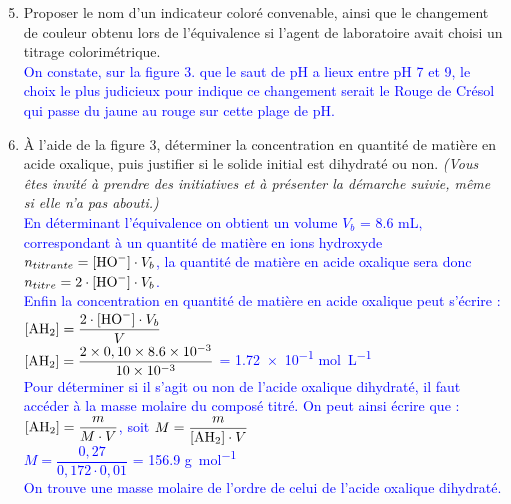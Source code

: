 \documentclass[a4paper,11pt]{article}
\begin{document}
\begin{enumerate}
\setcounter{enumi}{4}
    \item Proposer le nom d'un indicateur coloré convenable, ainsi que le changement de couleur obtenu lors de l'équivalence si l'agent de laboratoire avait choisi un titrage colorimétrique.\\
    \textcolor{blue}{On constate, sur la figure 3. que le saut de pH a lieux entre pH 7 et 9, le choix le plus judicieux pour indique ce changement serait le Rouge de Crésol qui passe du jaune au rouge sur cette plage de pH.}
    \item À l'aide de la figure 3, déterminer la concentration en quantité de matière en acide oxalique, puis justifier si le solide initial est dihydraté ou non. \emph{(Vous êtes invité à prendre des initiatives et à présenter la démarche suivie, même si elle n'a pas abouti.)}\\
    \textcolor{blue}{En déterminant l'équivalence on obtient un volume $V_b$ = \num{8,6} \unit{\milli\liter}, correspondant à un quantité de matière en ions hydroxyde $n_{titrante} =[\ce{HO-}] \cdot V_b$, la quantité de matière en acide oxalique sera donc $n_{titre} = 2\cdot[\ce{HO-}] \cdot V_b$.\\
    Enfin la concentration en quantité de matière en acide oxalique peut s'écrire : $[\ce{AH2}] = \dfrac{2\cdot[\ce{HO-}] \cdot V_b}{V}$\\
     $[\ce{AH2}] = \dfrac{2\times 0,10 \times \num{8,6e-3}}{\num{10e-3}}$ = \num{1,72e-1} \unit{\mole\per\liter}\\
    Pour déterminer si il s'agit ou non de l'acide oxalique dihydraté, il faut accéder à la masse molaire du composé titré. On peut ainsi écrire que :\\
    $[\ce{AH2}] = \dfrac{m}{M\cdot V}$, soit $M = \dfrac{m}{[\ce{AH2}] \cdot V}$\\
    $M = \dfrac{0,27}{0,172 \cdot 0,01}$ = \num{156,9} \unit{\gram\per\mole}\\
    On trouve une masse molaire de l'ordre de celui de l'acide oxalique dihydraté.}
\end{enumerate}
\end{document}
